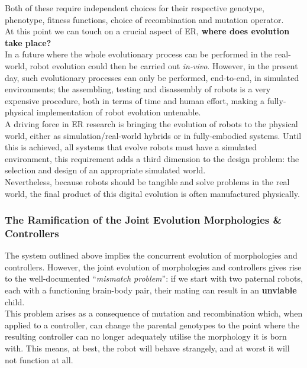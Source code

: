 \documentclass{scrartcl}
\begin{document}
Both of these require independent choices for their respective genotype, phenotype, fitness functions, choice of recombination and mutation operator. \\

At this point we can touch on a crucial aspect of ER, \textbf{where does evolution take place?} \\

In a future where the whole evolutionary process can be performed in the real-world, robot evolution could then be carried out \textit{in-vivo}.
However, in the present day, such evolutionary processes can only be performed, end-to-end, in simulated environments; the assembling, testing and disassembly of robots is a very expensive procedure, both in terms of time and human effort, making a fully-physical implementation of robot evolution untenable.\\

A driving force in ER research is bringing the evolution of robots to the physical world, either as simulation/real-world hybrids or in fully-embodied systems. 
Until this is achieved, all systems that evolve robots must have a simulated environment, this requirement adds a third dimension to the design problem: the selection and design of an appropriate simulated world.\\

Nevertheless, because robots should be tangible and solve problems in the real world, the final product of this digital evolution is often manufactured physically. \\

\subsubsection{The Ramification of the Joint Evolution Morphologies \& Controllers}
The system outlined above implies the concurrent evolution of morphologies and controllers.
However, the joint evolution of morphologies and controllers gives rise to the well-documented ``\textit{mismatch problem}''\cite{LeGoff2022}:
if we start with two paternal robots, each with a functioning brain-body pair, their mating can result in an \textbf{unviable} child.\\

This problem arises as a consequence of mutation and recombination which, when applied to a controller, can change the parental genotypes to the point where the resulting controller can no longer adequately utilise the morphology it is born with.
This means, at best, the robot will behave strangely, and at worst it will not function at all. \\
\end{document}
